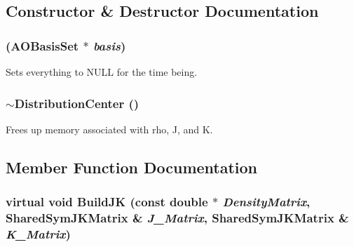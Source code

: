 \subsection{Constructor \& Destructor Documentation}
\hypertarget{classJKBuilder_1_1DistributionCenter_a188ebdd377e09a6e048a5e3f0b47a3ec}{
\subsubsection[{DistributionCenter}]{ ({\bf AOBasisSet} $\ast$ {\em basis})}}
\label{classJKBuilder_1_1DistributionCenter_a188ebdd377e09a6e048a5e3f0b47a3ec}


Sets everything to NULL for the time being. \hypertarget{classJKBuilder_1_1DistributionCenter_a2e0afd90ae098233a728d3c384196de2}{
\subsubsection[{$\sim$DistributionCenter}]{\setlength{\rightskip}{0pt plus 5cm}$\sim${\bf DistributionCenter} ()}}
\label{classJKBuilder_1_1DistributionCenter_a2e0afd90ae098233a728d3c384196de2}


Frees up memory associated with rho, J, and K. 

\subsection{Member Function Documentation}
\hypertarget{classJKBuilder_1_1JKFactory_ae253b309dafe3ce003fdabfd315318b8}{
\subsubsection[{BuildJK}]{\setlength{\rightskip}{0pt plus 5cm}virtual void BuildJK (const double $\ast$ {\em DensityMatrix}, \/  {\bf SharedSymJKMatrix} \& {\em J\_\-Matrix}, \/  {\bf SharedSymJKMatrix} \& {\em K\_\-Matrix})}}
\label{classJKBuilder_1_1JKFactory_ae253b309dafe3ce003fdabfd315318b8}



